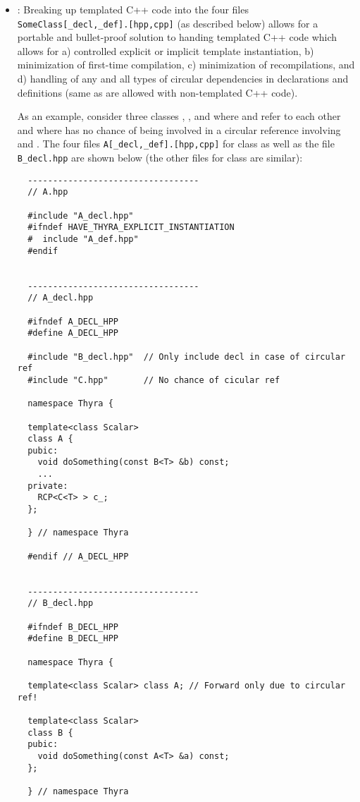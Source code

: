 \begin{itemize}
{}\item\GCGTemplateHeaders\label{gcg:template-instantation-files}: Breaking up
templated C++ code into the four files
{}\texttt{SomeClass[\_decl,\_def].[hpp,cpp]} (as described below) allows for a
portable and bullet-proof solution to handing templated C++ code which allows
for a) controlled explicit or implicit template instantiation, b) minimization
of first-time compilation, c) minimization of recompilations, and d) handling
of any and all types of circular dependencies in declarations and definitions
(same as are allowed with non-templated C++ code).

As an example, consider three classes {}, {}, and {}
where {} and {} refer to each other and where {} has no
chance of being involved in a circular reference involving {} and
{}.  The four files {}\texttt{A[\_decl,\_def].[hpp,cpp]} for class
{} as well as the file {}\texttt{B\_decl.hpp} are shown below (the
other files for class {} are similar):


{\small\begin{verbatim}
  ----------------------------------
  // A.hpp

  #include "A_decl.hpp"
  #ifndef HAVE_THYRA_EXPLICIT_INSTANTIATION
  #  include "A_def.hpp"
  #endif


  ----------------------------------
  // A_decl.hpp

  #ifndef A_DECL_HPP
  #define A_DECL_HPP

  #include "B_decl.hpp"  // Only include decl in case of circular ref
  #include "C.hpp"       // No chance of cicular ref

  namespace Thyra {

  template<class Scalar>
  class A {
  pubic:
    void doSomething(const B<T> &b) const;
    ...
  private:
    RCP<C<T> > c_;
  };

  } // namespace Thyra

  #endif // A_DECL_HPP


  ----------------------------------
  // B_decl.hpp

  #ifndef B_DECL_HPP
  #define B_DECL_HPP

  namespace Thyra {

  template<class Scalar> class A; // Forward only due to circular ref!

  template<class Scalar>
  class B {
  pubic:
    void doSomething(const A<T> &a) const;
  };

  } // namespace Thyra


\end{verbatim}}
\end{itemize}
